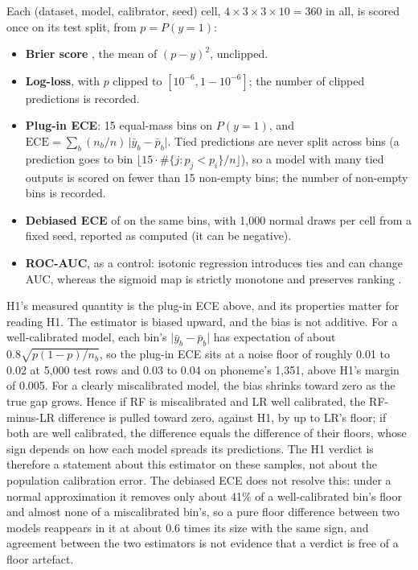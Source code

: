 \documentclass[11pt]{article}
\newcommand{\ds}[1]{\textsf{#1}}
\newcommand{\ph}{\ds{phoneme}}
\begin{document}
Each (dataset, model, calibrator, seed) cell, $4\times3\times3\times10=360$ in all, is scored
once on its test split, from $p=P(y=1)$:
\begin{itemize}
  \item \textbf{Brier score} \citep{brier1950}, the mean of $(p-y)^2$, unclipped.
  \item \textbf{Log-loss}, with $p$ clipped to $[10^{-6}, 1-10^{-6}]$; the number of clipped
        predictions is recorded.
  \item \textbf{Plug-in ECE}: 15 equal-mass bins on $P(y=1)$, and
        $\mathrm{ECE}=\sum_b (n_b/n)\,\lvert \bar y_b-\bar p_b\rvert$. Tied predictions are
        never split across bins (a prediction goes to bin
        $\lfloor 15\cdot\#\{j: p_j<p_i\}/n\rfloor$), so a model with many tied outputs is
        scored on fewer than 15 non-empty bins; the number of non-empty bins is recorded.
  \item \textbf{Debiased ECE} of \citet[Def.~G.3]{kumar2019} on the same bins, with 1,000
        normal draws per cell from a fixed seed, reported as computed (it can be negative).
  \item \textbf{ROC-AUC}, as a control: isotonic regression introduces ties and can change
        AUC, whereas the sigmoid map is strictly monotone and preserves ranking
        \citep{sklearn_calibration_docs}.
\end{itemize}

H1's measured quantity is the plug-in ECE above, and its properties matter for reading H1.
The estimator is biased upward, and the bias is not additive. For a well-calibrated model,
each bin's $\lvert \bar y_b-\bar p_b\rvert$ has expectation of about
$0.8\sqrt{p(1-p)/n_b}$, so the plug-in ECE sits at a noise floor of roughly 0.01 to 0.02 at
5,000 test rows and 0.03 to 0.04 on \ph's 1,351, above H1's margin of 0.005. For a clearly
miscalibrated model, the bias shrinks toward zero as the true gap grows. Hence if RF is
miscalibrated and LR well calibrated, the RF-minus-LR difference is pulled toward zero,
against H1, by up to LR's floor; if both are well calibrated, the difference equals the
difference of their floors, whose sign depends on how each model spreads its predictions. The
H1 verdict is therefore a statement about this estimator on these samples, not about the
population calibration error. The debiased ECE does not resolve this: under a normal
approximation it removes only about 41\% of a well-calibrated bin's floor and almost none of a
miscalibrated bin's, so a pure floor difference between two models reappears in it at about
0.6 times its size with the same sign, and agreement between the two estimators is not
evidence that a verdict is free of a floor artefact.
\end{document}
